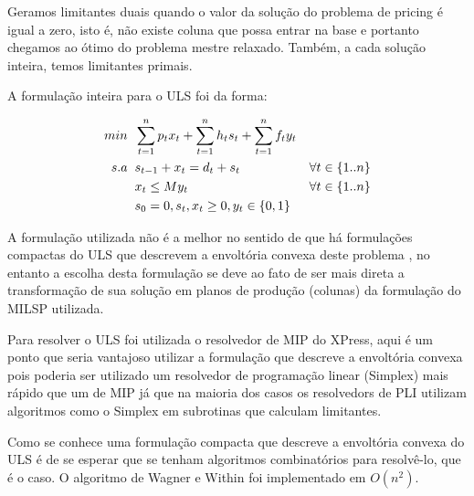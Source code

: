 \documentclass[letterpaper,11pt]{article}
\begin{document}
Geramos limitantes duais quando o valor da solução do problema de
pricing é igual a zero, isto é, não existe coluna que possa entrar na
base e portanto chegamos ao ótimo do problema mestre relaxado. Também,
a cada solução inteira, temos limitantes primais.

A formulação inteira para o ULS foi da forma:

\begin{align}
  min \hspace{0.2cm}&  \sum_{t=1}^n p_tx_t + \sum_{t=1}^n h_ts_t + \sum_{t=1}^n
  f_ty_t \notag\\
  s.a \hspace{0.2cm}&  s_{t-1} + x_t = d_t + s_t &\forall t \in \{1..n\} \notag\\
      &  x_{t} \leq My_t &\forall t \in \{1..n\} \notag\\
      &  s_0 = 0, s_t, x_t \geq 0, y_t \in \{0,1\} \notag
\end{align}

A formulação utilizada não é a melhor no sentido de que há formulações
compactas do ULS que descrevem a envoltória convexa deste problema
\cite{wolsey2000ip}, no entanto a escolha desta formulação se deve ao
fato de ser mais direta a transformação de sua solução em planos de
produção (colunas) da formulação do MILSP utilizada.

Para resolver o ULS foi utilizada o resolvedor de MIP do XPress, aqui
é um ponto que seria vantajoso utilizar a formulação que descreve a
envoltória convexa pois poderia ser utilizado um resolvedor de
programação linear (Simplex) mais rápido que um de MIP já que na
maioria dos casos os resolvedors de PLI utilizam algoritmos como o
Simplex em subrotinas que calculam limitantes.



Como se conhece uma formulação compacta que descreve a envoltória
convexa do ULS é de se esperar que se tenham algoritmos combinatórios
para resolvê-lo, que é o caso. O algoritmo de Wagner e Within foi
implementado em $O(n^2)$.
\end{document}
